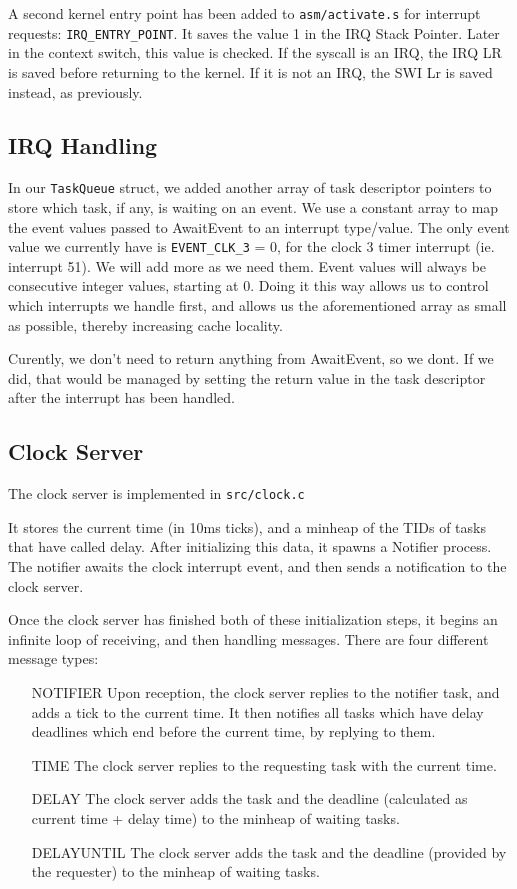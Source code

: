 \documentclass{article}
\begin{document}
    A second kernel entry point has been added to \verb|asm/activate.s| for interrupt requests: \verb|IRQ_ENTRY_POINT|. It saves the value 1 in the IRQ Stack Pointer. Later in the context switch, this value is checked. If the syscall is an IRQ, the IRQ LR is saved before returning to the kernel. If it is not an IRQ, the SWI Lr is saved instead, as previously.

\subsection{IRQ Handling}
In our \verb|TaskQueue| struct, we added another array of task descriptor pointers to store which task, if any, is waiting on an event.
We use a constant array to map the event values passed to AwaitEvent to an interrupt type/value. The only event value we currently have is \verb|EVENT_CLK_3| = 0, for the clock 3 timer interrupt (ie. interrupt 51). We will add more as we need them. Event values will always be consecutive integer values, starting at 0. Doing it this way allows us to control which interrupts we handle first, and allows us the aforementioned array as small as possible, thereby increasing cache locality.

Curently, we don't need to return anything from AwaitEvent, so we dont. If we did, that would be managed by setting the return value in the task descriptor after the interrupt has been handled.
\subsection{Clock Server}
The clock server is implemented in \verb|src/clock.c|

It stores the current time (in 10ms ticks), and a minheap of the TIDs of tasks that have called delay.
After initializing this data, it spawns a Notifier process. 
The notifier awaits the clock interrupt event, and then sends a notification to the clock server.

Once the clock server has finished both of these initialization steps, it begins an infinite loop of receiving, and then handling messages.
There are four different message types:
\begin{enumerate}
    \item[NOTIFIER] Upon reception, the clock server replies to the notifier task, and adds a tick to the current time.
    It then notifies all tasks which have delay deadlines which end before the current time, by replying to them.
    \item [TIME] The clock server replies to the requesting task with the current time.
    \item[DELAY] The clock server adds the task and the deadline (calculated as current time + delay time) to the minheap of waiting tasks.
    \item[DELAYUNTIL] The clock server adds the task and the deadline (provided by the requester) to the minheap of waiting tasks.
\end{enumerate}
\end{document}
